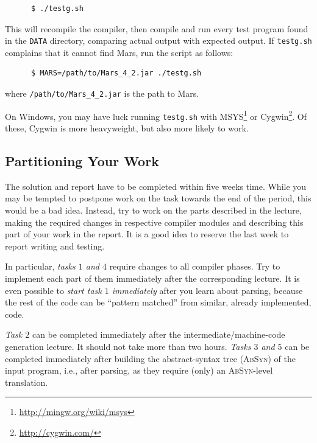 \documentclass[a4paper,11pt]{article}
\newcommand{\mars}{Mars\xspace}
\begin{document}
\begin{verbatim}
      $ ./testg.sh
\end{verbatim}

This will recompile the compiler, then compile and run every test
program found in the \texttt{DATA} directory, comparing actual output
with expected output.  If \texttt{testg.sh} complains that it cannot
find \mars, run the script as follows:

\begin{verbatim}
      $ MARS=/path/to/Mars_4_2.jar ./testg.sh
\end{verbatim}
\noindent
where \texttt{/path/to/Mars\_4\_2.jar} is the path to \mars.

On Windows, you may have luck running \texttt{testg.sh} with
MSYS\footnote{\url{http://mingw.org/wiki/msys}} or
Cygwin\footnote{\url{http://cygwin.com/}}.  Of these, Cygwin is more
heavyweight, but also more likely to work.

\subsection{Partitioning Your Work}

The solution and report have to be completed within five weeks time.
While you may be tempted to
postpone work on the task towards the end of the period, this would be a bad 
idea. Instead, try to work on the parts described in the lecture, 
making the required changes in respective compiler modules and describing
this part of your work in the report. 
It is a good idea to reserve the last week to report writing and testing.

In particular, \emph{tasks $1$ and $4$} require changes to all compiler phases.
Try to implement each part of them immediately after the corresponding
lecture. It is even possible to \emph{start task $1$ immediately} after you
learn about parsing, because the rest of the code can be ``pattern matched''
from similar, already implemented, code.  

\emph{Task $2$} can be completed immediately after the intermediate/machine-code
generation lecture. It should not take more than two hours.
\emph{Tasks $3$ and $5$} can be completed immediately after building the 
abstract-syntax tree (\textsc{AbSyn}) of the input program, i.e., after
parsing, as they require (only) an \textsc{AbSyn}-level translation.
   
\end{document}
